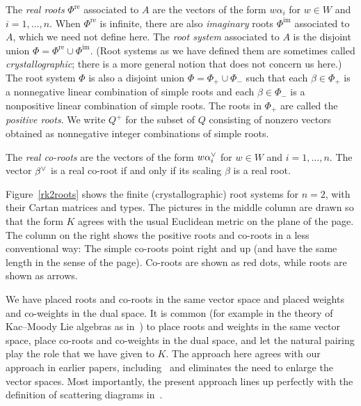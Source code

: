 \documentclass[ALCO,ThmDefs,Unicode,epreuves]{cedram}
\DeclareMathOperator{\re}{re}
\DeclareMathOperator{\im}{im}
\newcommand{\newword}[1]{\emph{#1}}
\newcommand{\ck}{\spcheck}
\begin{document}
The \newword{real roots} $\Phi^{\re}$ associated to $A$ are the vectors of the form $w\alpha_i$ for $w\in W$ and $i=1,\ldots,n$.
When $\Phi^{\re}$ is infinite, there are also \newword{imaginary} roots $\Phi^{\im}$ associated to $A$, which we need not define here.
The \newword{root system} associated to $A$ is the disjoint union $\Phi=\Phi^{\re}\cup\Phi^{\im}$.
(Root systems as we have defined them are sometimes called \newword{crystallographic}; there is a more general notion that does not concern us here.)
The root system $\Phi$ is also a disjoint union $\Phi=\Phi_+\cup\Phi_-$ such that each $\beta\in\Phi_+$ is a nonnegative linear combination of simple roots and each $\beta\in\Phi_-$ is a nonpositive linear combination of simple roots.
The roots in $\Phi_+$ are called the \newword{positive roots}.
We write $Q^+$ for the subset of $Q$ consisting of nonzero vectors obtained as nonnegative integer combinations of simple roots. 


The \newword{real co-roots} %
are the vectors of the form $w\alpha\ck_i$ for $w\in W$ and $i=1,\ldots,n$.
The vector $\beta\ck$ is a real co-root if and only if its scaling $\beta$ is a real root.

Figure~\ref{rk2roots} shows the finite (crystallographic) root systems for $n=2$, with their Cartan matrices and types.
The pictures in the middle column are drawn so that the form $K$ agrees with the usual Euclidean metric on the plane of the page.
The column on the right shows the positive roots and co-roots in a less conventional way:
The simple co-roots point right and up (and have the same length in the sense of the page).
Co-roots are shown as red dots, while roots are shown as arrows.

\begin{rema}\label{my way is better}
We have placed roots and co-roots in the same vector space and placed weights and co-weights in the dual space.
It is common (for example in the theory of Kac--Moody Lie algebras as in~\cite{Kac}) to place roots and weights in the same vector space, place co-roots and co-weights in the dual space, and let the natural pairing play the role that we have given to $K$.
The approach here agrees with our approach in earlier papers, including~\cite{typefree,framework,afframe,cyclica,affdenom} and eliminates the need to enlarge the vector spaces. %
Most importantly, the present approach lines up perfectly with the definition of scattering diagrams in~\cite{GHKK}.
\end{rema}
\end{document}
